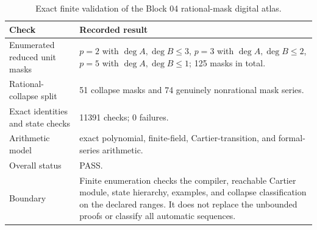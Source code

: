 \begin{table}[htbp]
\centering
\caption{Exact finite validation of the Block 04 rational-mask digital atlas.}
\label{tab:block04-validation}
\small
\begin{tabularx}{\textwidth}{@{}L{0.28\textwidth}Y@{}}
\toprule
Check & Recorded result\\
\midrule
Enumerated reduced unit masks & $p=2$ with $\deg A,\deg B\leq 3$, $p=3$ with $\deg A,\deg B\leq 2$, $p=5$ with $\deg A,\deg B\leq 1$; 125 masks in total.\\
Rational-collapse split & 51 collapse masks and 74 genuinely nonrational mask series.\\
Exact identities and state checks & 11391 checks; 0 failures.\\
Arithmetic model & exact polynomial, finite-field, Cartier-transition, and formal-series arithmetic.\\
Overall status & PASS.\\
Boundary & Finite enumeration checks the compiler, reachable Cartier module, state hierarchy, examples, and collapse classification on the declared ranges. It does not replace the unbounded proofs or classify all automatic sequences.\\
\bottomrule
\end{tabularx}
\end{table}
